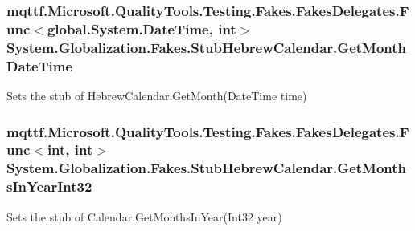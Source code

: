 \hypertarget{class_system_1_1_globalization_1_1_fakes_1_1_stub_hebrew_calendar_ab429e3c5c498d11df91cfeb896b07e6f}{
\subsubsection[{Get\-Month\-Date\-Time}]{\setlength{\rightskip}{0pt plus 5cm}mqttf.\-Microsoft.\-Quality\-Tools.\-Testing.\-Fakes.\-Fakes\-Delegates.\-Func$<$global.\-System.\-Date\-Time, int$>$ System.\-Globalization.\-Fakes.\-Stub\-Hebrew\-Calendar.\-Get\-Month\-Date\-Time}}\label{class_system_1_1_globalization_1_1_fakes_1_1_stub_hebrew_calendar_ab429e3c5c498d11df91cfeb896b07e6f}


Sets the stub of Hebrew\-Calendar.\-Get\-Month(\-Date\-Time time)

\hypertarget{class_system_1_1_globalization_1_1_fakes_1_1_stub_hebrew_calendar_a5269004b21c552a1956b40e0147c82ae}{
\subsubsection[{Get\-Months\-In\-Year\-Int32}]{\setlength{\rightskip}{0pt plus 5cm}mqttf.\-Microsoft.\-Quality\-Tools.\-Testing.\-Fakes.\-Fakes\-Delegates.\-Func$<$int, int$>$ System.\-Globalization.\-Fakes.\-Stub\-Hebrew\-Calendar.\-Get\-Months\-In\-Year\-Int32}}\label{class_system_1_1_globalization_1_1_fakes_1_1_stub_hebrew_calendar_a5269004b21c552a1956b40e0147c82ae}


Sets the stub of Calendar.\-Get\-Months\-In\-Year(\-Int32 year)

